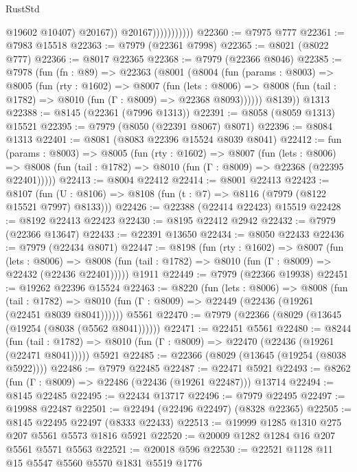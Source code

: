 \begin{lexlean}{RustStd}
\begin{coremodule}
                                @19602
                                @10407)
                              @20167))
                          @20167)))))))))))
@22360 := @7975 @777
@22361 := @7983 @15518
@22363 := @7979 (@22361 @7998)
@22365 := @8021 (@8022 @777)
@22366 := @8017 @22365
@22368 := @7979 (@22366 @8046)
@22385 := @7978
    (fun (fn : @89) =>
    @22363
      (@8001
        (@8004
          (fun (params : @8003) =>
          @8005
            (fun (rty : @1602) =>
            @8007
              (fun (lets : @8006) =>
              @8008 (fun (tail : @1782) => @8010 (fun (Γ : @8009) => @22368 @8093))))))
        @8139))
    @1313
@22388 := @8145 (@22361 (@7996 @1313))
@22391 := @8058 (@8059 @1313) @15521
@22395 := @7979 (@8050 (@22391 @8067) @8071)
@22396 := @8084 @1313
@22401 := @8081 (@8083 @22396 @15524 @8039 @8041)
@22412 := fun (params : @8003) =>
  @8005
    (fun (rty : @1602) =>
    @8007
      (fun (lets : @8006) =>
      @8008 (fun (tail : @1782) => @8010 (fun (Γ : @8009) => @22368 (@22395 @22401)))))
@22413 := @8004 @22412
@22414 := @8001 @22413
@22423 := @8107
    (fun (U : @8106) => @8108 (fun (t : @7) => @8116 (@7979 (@8122 @15521 @7997) @8133)))
@22426 := @22388 (@22414 @22423) @15519
@22428 := @8192 @22413 @22423
@22430 := @8195 @22412 @2942
@22432 := @7979 (@22366 @13647)
@22433 := @22391 @13650
@22434 := @8050 @22433
@22436 := @7979 (@22434 @8071)
@22447 := @8198
    (fun (rty : @1602) =>
    @8007
      (fun (lets : @8006) =>
      @8008 (fun (tail : @1782) => @8010 (fun (Γ : @8009) => @22432 (@22436 @22401)))))
    @1911
@22449 := @7979 (@22366 @19938)
@22451 := @19262 @22396 @15524
@22463 := @8220
    (fun (lets : @8006) =>
    @8008
      (fun (tail : @1782) =>
      @8010 (fun (Γ : @8009) => @22449 (@22436 (@19261 (@22451 @8039 @8041))))))
    @5561
@22470 := @7979 (@22366 (@8029 (@13645 (@19254 (@8038 (@5562 @8041))))))
@22471 := @22451 @5561
@22480 := @8244
    (fun (tail : @1782) => @8010 (fun (Γ : @8009) => @22470 (@22436 (@19261 (@22471 @8041)))))
    @5921
@22485 := @22366 (@8029 (@13645 (@19254 (@8038 @5922))))
@22486 := @7979 @22485
@22487 := @22471 @5921
@22493 := @8262 (fun (Γ : @8009) => @22486 (@22436 (@19261 @22487))) @13714
@22494 := @8145 @22485
@22495 := @22434 @13717
@22496 := @7979 @22495
@22497 := @19988 @22487
@22501 := @22494 (@22496 @22497) (@8328 @22365)
@22505 := @8145 @22495 @22497 (@8333 @22433)
@22513 := @19999 @1285 @1310 @275 @207 @5561 @5573 @1816 @5921
@22520 := @20009 @1282 @1284 @16 @207 @5561 @5571 @5563
@22521 := @20018 @596
@22530 := @22521 @1128 @11 @15 @5547 @5560 @5570 @1831 @5519 @1776

\end{coremodule}
\end{lexlean}
